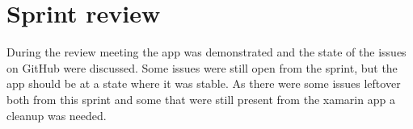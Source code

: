 \section{Sprint review}
During the review meeting the app was demonstrated and the state of the issues on GitHub were discussed.
Some issues were still open from the sprint, but the app should be at a state where it was stable.
As there were some issues leftover both from this sprint and some that were still present from the xamarin app a cleanup was needed.
